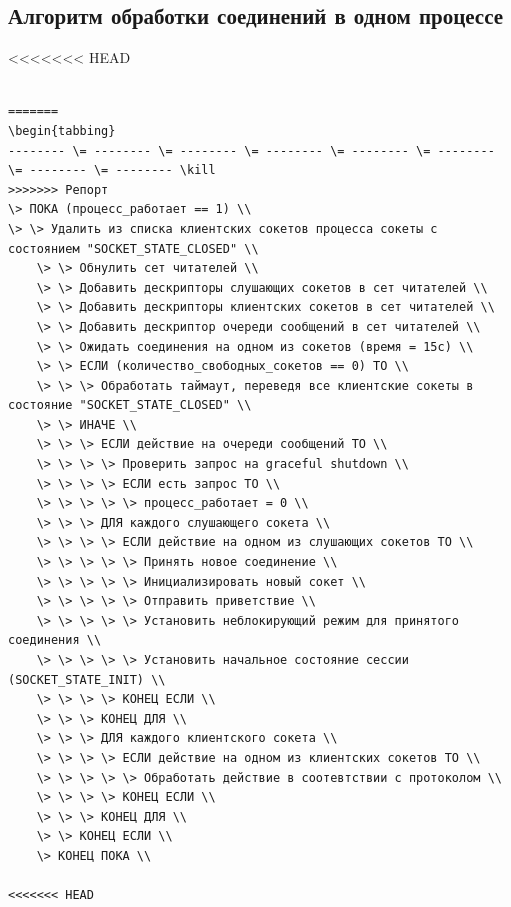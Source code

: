 \documentclass[a4paper,12pt]{report}
\begin{document}
\subsection{Алгоритм обработки соединений в одном процессе}
<<<<<<< HEAD
\begin{verbatim}

=======
\begin{tabbing}
-------- \= -------- \= -------- \= -------- \= -------- \= -------- \= -------- \= -------- \kill
>>>>>>> Репорт
\> ПОКА (процесс_работает == 1) \\
\> \> Удалить из списка клиентских сокетов процесса сокеты с состоянием "SOCKET_STATE_CLOSED" \\
    \> \> Обнулить сет читателей \\
    \> \> Добавить дескрипторы слушающих сокетов в сет читателей \\
    \> \> Добавить дескрипторы клиентских сокетов в сет читателей \\
    \> \> Добавить дескриптор очереди сообщений в сет читателей \\ 
    \> \> Ожидать соединения на одном из сокетов (время = 15с) \\
    \> \> ЕСЛИ (количество_свободных_сокетов == 0) ТО \\
    \> \> \> Обработать таймаут, переведя все клиентские сокеты в состояние "SOCKET_STATE_CLOSED" \\
    \> \> ИНАЧЕ \\
    \> \> \> ЕСЛИ действие на очереди сообщений ТО \\
    \> \> \> \> Проверить запрос на graceful shutdown \\
    \> \> \> \> ЕСЛИ есть запрос ТО \\
    \> \> \> \> \> процесс_работает = 0 \\
    \> \> \> ДЛЯ каждого слушающего сокета \\
    \> \> \> \> ЕСЛИ действие на одном из слушающих сокетов ТО \\
    \> \> \> \> \> Принять новое соединение \\
    \> \> \> \> \> Инициализировать новый сокет \\
    \> \> \> \> \> Отправить приветствие \\
    \> \> \> \> \> Установить неблокирующий режим для принятого соединения \\
    \> \> \> \> \> Установить начальное состояние сессии (SOCKET_STATE_INIT) \\
    \> \> \> \> КОНЕЦ ЕСЛИ \\
    \> \> \> КОНЕЦ ДЛЯ \\
    \> \> \> ДЛЯ каждого клиентского сокета \\
    \> \> \> \> ЕСЛИ действие на одном из клиентских сокетов ТО \\
    \> \> \> \> \> Обработать действие в соотевтствии с протоколом \\
    \> \> \> \> КОНЕЦ ЕСЛИ \\
    \> \> \> КОНЕЦ ДЛЯ \\
    \> \> КОНЕЦ ЕСЛИ \\
    \> КОНЕЦ ПОКА \\

<<<<<<< HEAD
\end{verbatim}
\end{document}
